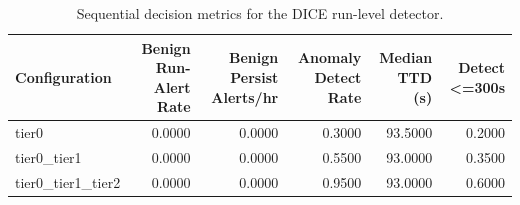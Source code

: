 \begin{table}[t]
\centering
\caption{Sequential decision metrics for the DICE run-level detector.}
\label{tab:dice_sequential_metrics}
\footnotesize
\begin{tabular}{lrrrrr}
\toprule
Configuration & Benign Run-Alert Rate & Benign Persist Alerts/hr & Anomaly Detect Rate & Median TTD (s) & Detect <=300s \\
\midrule
tier0 & 0.0000 & 0.0000 & 0.3000 & 93.5000 & 0.2000 \\
tier0_tier1 & 0.0000 & 0.0000 & 0.5500 & 93.0000 & 0.3500 \\
tier0_tier1_tier2 & 0.0000 & 0.0000 & 0.9500 & 93.0000 & 0.6000 \\
\bottomrule
\end{tabular}

\end{table}
